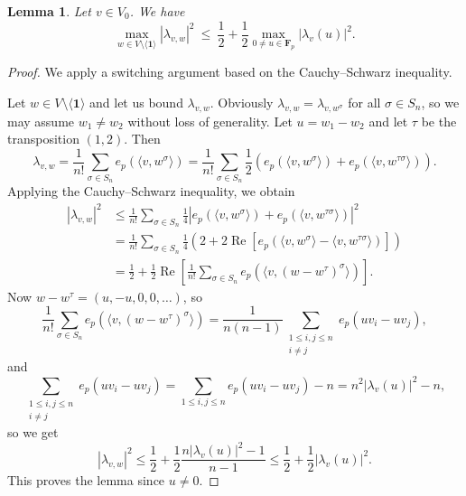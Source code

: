 \documentclass[11pt]{amsart}
\numberwithin{equation}{section}
\newtheorem{lemma}[theorem]{Lemma}
\theoremstyle{remark}
\newcommand{\op}{\operatorname}
\newcommand{\F}{\mathbf{F}}
\renewcommand{\Re}{\op{Re}}
\newcommand\br[1]{{\left(#1\right)}}
\newcommand{\gen}[1]{\langle{#1}\rangle}
\def\one{\mathbf{1}}
\begin{document}
\begin{lemma}
    \label{lem:switching}
    Let $v \in V_0$. We have
    \[
       \max_{w \in V \setminus \gen\one} |\lambda_{v, w}|^2
       \> \le \>
       \frac12 + \frac12 \max_{0 \ne u \in \F_p} |\lambda_v(u)|^2.
    \]
\end{lemma}
\begin{proof}
    We apply a switching argument based on the Cauchy--Schwarz inequality.

    Let $w \in V \setminus \gen\one$ and let us bound $\lambda_{v,w}$.
    Obviously $\lambda_{v, w} = \lambda_{v, w^\sigma}$ for all $\sigma \in S_n$, so we may assume $w_1 \ne w_2$ without loss of generality. Let $u = w_1 - w_2$ and let $\tau$ be the transposition $(1,2)$. Then
    \[
        \lambda_{v,w}
        = \frac1{n!} \sum_{\sigma \in S_n} e_p( \gen{v, w^\sigma})
        = \frac1{n!} \sum_{\sigma \in S_n} \frac12 \br{e_p(\gen{v, w^\sigma}) + e_p(\gen{v, w^{\tau\sigma}})}.
    \]
    Applying the Cauchy--Schwarz inequality, we obtain
    \begin{align*}
        |\lambda_{v,w}|^2
        &\le \frac1{n!} \sum_{\sigma \in S_n}
        \frac14 \left|
            e_p(\gen{v, w^\sigma}) + e_p(\gen{v, w^{\tau\sigma}})
        \right|^2 \\
        &= \frac1{n!} \sum_{\sigma \in S_n}
        \frac14 \br{
            2 + 2 \Re\left[e_p(\gen{v, w^\sigma} - \gen{v, w^{\tau\sigma}})\right]
        }\\
        &= \frac12 + \frac12 \Re\left[\frac1{n!}\sum_{\sigma \in S_n}
            e_p(\langle v, (w - w^\tau)^\sigma\rangle)
        \right].
    \end{align*}
    Now $w - w^\tau = (u, -u, 0, 0, \dots)$, so
    \[
        \frac1{n!} \sum_{\sigma \in S_n} e_p(\gen{v, (w-w^\tau)^\sigma})
        = \frac1{n(n-1)} \sum_{\substack{1 \le i, j \le n \\ i \ne j}}
        e_p(u v_i - u v_j),
    \]
    and
    \[
        \sum_{\substack{1 \le i, j \le n \\ i \ne j}} e_p(u v_i - u v_j)
        = \sum_{1 \le i, j \le n} e_p(u v_i - u v_j) - n
        = n^2 |\lambda_v(u)|^2 - n,
    \]
    so we get
    \[
        |\lambda_{v,w}|^2
        \le \frac12 + \frac12 \frac{n|\lambda_v(u)|^2 - 1}{n-1}
        \le \frac12 + \frac12 |\lambda_v(u)|^2.
    \]
    This proves the lemma since $u \ne 0$.
\end{proof}
\end{document}
